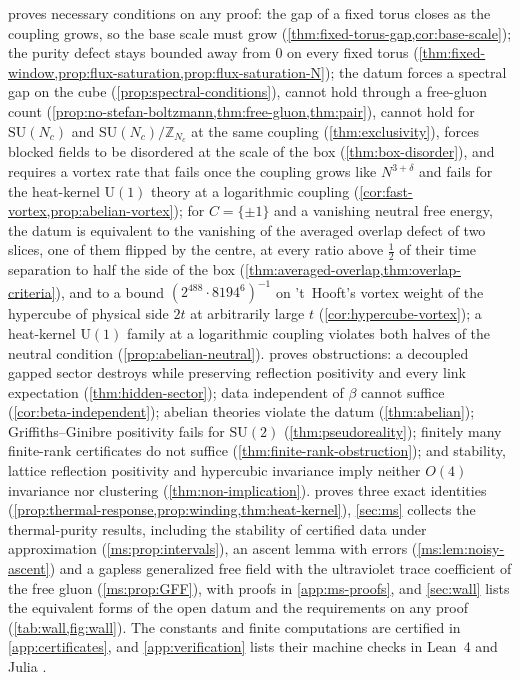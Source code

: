 \documentclass[11pt,a4paper]{amsart}
\theoremstyle{definition}
\theoremstyle{remark}
\numberwithin{equation}{section}
\newcommand{\Z}{\mathbb{Z}}          %
\newcommand{\SU}{\mathrm{SU}}              %
\newcommand{\U}{\mathrm{U}}                %
\newcommand{\Mcirc}{\text{\upshape(M$^{\circ}$)}}   %
\begin{document}
 proves necessary conditions on any proof: the gap of a fixed torus closes as the coupling grows, so the base scale must grow (\cref{thm:fixed-torus-gap,cor:base-scale}); the purity defect stays bounded away from $0$ on every fixed torus (\cref{thm:fixed-window,prop:flux-saturation,prop:flux-saturation-N}); the datum forces a spectral gap on the cube (\cref{prop:spectral-conditions}), cannot hold through a free-gluon count (\cref{prop:no-stefan-boltzmann,thm:free-gluon,thm:pair}), cannot hold for $\SU(N_c)$ and $\SU(N_c)/\Z_{N_c}$ at the same coupling (\cref{thm:exclusivity}), forces blocked fields to be disordered at the scale of the box (\cref{thm:box-disorder}), and requires a vortex rate that fails once the coupling grows like $N^{3+\delta}$ and fails for the heat-kernel $\U(1)$ theory at a logarithmic coupling (\cref{cor:fast-vortex,prop:abelian-vortex}); for $C=\{\pm1\}$ and a vanishing neutral free energy, the datum is equivalent to the vanishing of the averaged overlap defect of two slices, one of them flipped by the centre, at every ratio above $\frac12$ of their time separation to half the side of the box (\cref{thm:averaged-overlap,thm:overlap-criteria}), and to a bound $(2^{488}\cdot8194^6)^{-1}$ on 't~Hooft's vortex weight of the hypercube of physical side $2t$ at arbitrarily large $t$ (\cref{cor:hypercube-vortex}); a heat-kernel $\U(1)$ family at a logarithmic coupling violates both halves of the neutral condition (\cref{prop:abelian-neutral}).  proves obstructions: a decoupled gapped sector destroys \Mcirc{} while preserving reflection positivity and every link expectation (\cref{thm:hidden-sector}); data independent of $\beta$ cannot suffice (\cref{cor:beta-independent}); abelian theories violate the datum (\cref{thm:abelian}); Griffiths--Ginibre positivity fails for $\SU(2)$ (\cref{thm:pseudoreality}); finitely many finite-rank certificates do not suffice (\cref{thm:finite-rank-obstruction}); and stability, lattice reflection positivity and hypercubic invariance imply neither $O(4)$ invariance nor clustering (\cref{thm:non-implication}).  proves three exact identities (\cref{prop:thermal-response,prop:winding,thm:heat-kernel}), \cref{sec:ms} collects the thermal-purity results, including the stability of certified data under approximation (\cref{ms:prop:intervals}), an ascent lemma with errors (\cref{ms:lem:noisy-ascent}) and a gapless generalized free field with the ultraviolet trace coefficient of the free gluon (\cref{ms:prop:GFF}), with proofs in \cref{app:ms-proofs}, and \cref{sec:wall} lists the equivalent forms of the open datum and the requirements on any proof (\cref{tab:wall,fig:wall}). The constants and finite computations are certified in \cref{app:certificates}, and \cref{app:verification} lists their machine checks in Lean~4 \cite{demoura2021,mathlib2020} and Julia \cite{bezanson2017}.
\end{document}
